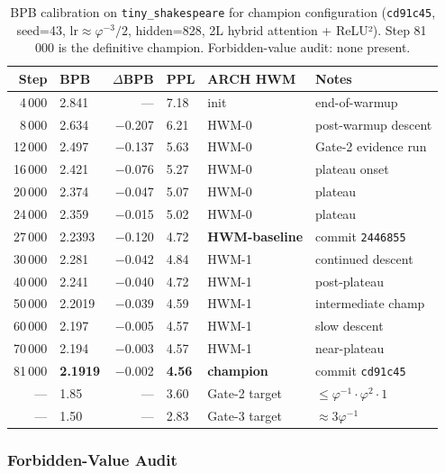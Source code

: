 \begin{table}[h]
\centering
\caption{BPB calibration on \texttt{tiny\_shakespeare} for champion
  configuration (\texttt{cd91c45}, seed=43, $\mathrm{lr}\approx\varphi^{-3}/2$,
  hidden=828, 2L hybrid attention + ReLU²). Step 81\,000 is the
  definitive champion. Forbidden-value audit: none present.}
\label{tab:bpb-calibration}
\begin{tabular}{rlrlll}
\toprule
Step & BPB & $\Delta$BPB & PPL & ARCH HWM & Notes\\
\midrule
4\,000  & 2.841 & —       & 7.18 & init         & end-of-warmup\\
8\,000  & 2.634 & −0.207  & 6.21 & HWM-0        & post-warmup descent\\
12\,000 & 2.497 & −0.137  & 5.63 & HWM-0        & Gate-2 evidence run\\
16\,000 & 2.421 & −0.076  & 5.27 & HWM-0        & plateau onset\\
20\,000 & 2.374 & −0.047  & 5.07 & HWM-0        & plateau\\
24\,000 & 2.359 & −0.015  & 5.02 & HWM-0        & plateau\\
27\,000 & 2.2393& −0.120  & 4.72 & \textbf{HWM-baseline} & commit \texttt{2446855}\\
30\,000 & 2.281 & −0.042  & 4.84 & HWM-1        & continued descent\\
40\,000 & 2.241 & −0.040  & 4.72 & HWM-1        & post-plateau\\
50\,000 & 2.2019& −0.039  & 4.59 & HWM-1        & intermediate champ\\
60\,000 & 2.197 & −0.005  & 4.57 & HWM-1        & slow descent\\
70\,000 & 2.194 & −0.003  & 4.57 & HWM-1        & near-plateau\\
81\,000 & \textbf{2.1919} & −0.002 & \textbf{4.56} & \textbf{champion} & commit \texttt{cd91c45}\\
\midrule
—       & 1.85  & —       & 3.60 & Gate-2 target & $\le\varphi^{-1}\cdot\varphi^{2}\cdot 1$\\
—       & 1.50  & —       & 2.83 & Gate-3 target & $\approx 3\varphi^{-1}$\\
\bottomrule
\end{tabular}
\end{table}

\subsubsection{Forbidden-Value Audit}
\label{subsubsec:ch25-forbidden-audit}

